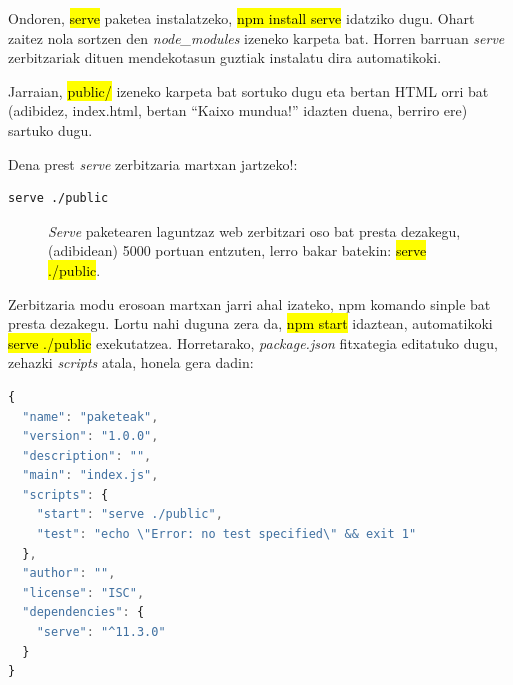 Ondoren, \hl{serve} paketea instalatzeko, \hl{npm install serve} idatziko dugu. Ohart zaitez nola sortzen den \textit{node\_modules} izeneko karpeta bat. Horren barruan \textit{serve} zerbitzariak dituen mendekotasun guztiak instalatu dira automatikoki.

Jarraian, \hl{public/} izeneko karpeta bat sortuko dugu eta bertan HTML orri bat (adibidez, index.html, bertan ``Kaixo mundua!'' idazten duena, berriro ere) sartuko dugu.

Dena prest \textit{serve} zerbitzaria martxan jartzeko!:

\begin{lstlisting}[language=Bash,numbers=none]
serve ./public     
\end{lstlisting}

\begin{figure}[ht]
	\centering
{}
\caption{\textit{Serve} paketearen laguntzaz web zerbitzari oso bat presta dezakegu, (adibidean) 5000 portuan entzuten, lerro bakar batekin: \hl{serve ./public}.}
\label{fig:node2}
\end{figure}

Zerbitzaria modu erosoan martxan jarri ahal izateko, npm komando sinple bat presta dezakegu. Lortu nahi duguna zera da,  \hl{npm start} idaztean, automatikoki \hl{serve ./public} exekutatzea. Horretarako, \textit{package.json} fitxategia  editatuko dugu, zehazki \textit{scripts} atala, honela gera dadin:

\begin{lstlisting}[language=JavaScript,numbers=none]
 {
  "name": "paketeak",
  "version": "1.0.0",
  "description": "",
  "main": "index.js",
  "scripts": {
    "start": "serve ./public",
    "test": "echo \"Error: no test specified\" && exit 1"
  },
  "author": "",
  "license": "ISC",
  "dependencies": {
    "serve": "^11.3.0"
  }
}
\end{lstlisting}

